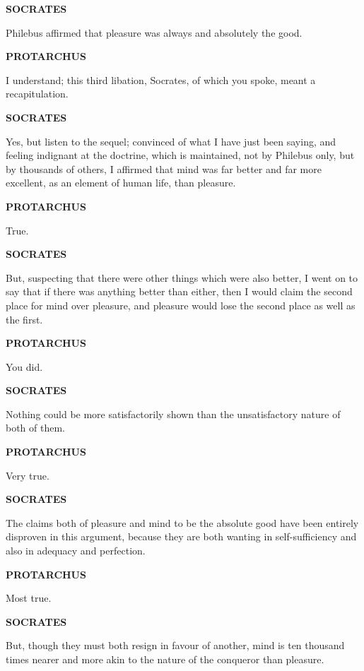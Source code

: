 \documentclass[11pt,letter]{article}
\begin{document}
\par \textbf{SOCRATES}
\par   Philebus affirmed that pleasure was always and absolutely the good.

\par \textbf{PROTARCHUS}
\par   I understand; this third libation, Socrates, of which you spoke, meant a recapitulation.

\par \textbf{SOCRATES}
\par   Yes, but listen to the sequel; convinced of what I have just been saying, and feeling indignant at the doctrine, which is maintained, not by Philebus only, but by thousands of others, I affirmed that mind was far better and far more excellent, as an element of human life, than pleasure.

\par \textbf{PROTARCHUS}
\par   True.

\par \textbf{SOCRATES}
\par   But, suspecting that there were other things which were also better, I went on to say that if there was anything better than either, then I would claim the second place for mind over pleasure, and pleasure would lose the second place as well as the first.

\par \textbf{PROTARCHUS}
\par   You did.

\par \textbf{SOCRATES}
\par   Nothing could be more satisfactorily shown than the unsatisfactory nature of both of them.

\par \textbf{PROTARCHUS}
\par   Very true.

\par \textbf{SOCRATES}
\par   The claims both of pleasure and mind to be the absolute good have been entirely disproven in this argument, because they are both wanting in self-sufficiency and also in adequacy and perfection.

\par \textbf{PROTARCHUS}
\par   Most true.

\par \textbf{SOCRATES}
\par   But, though they must both resign in favour of another, mind is ten thousand times nearer and more akin to the nature of the conqueror than pleasure.
\end{document}
